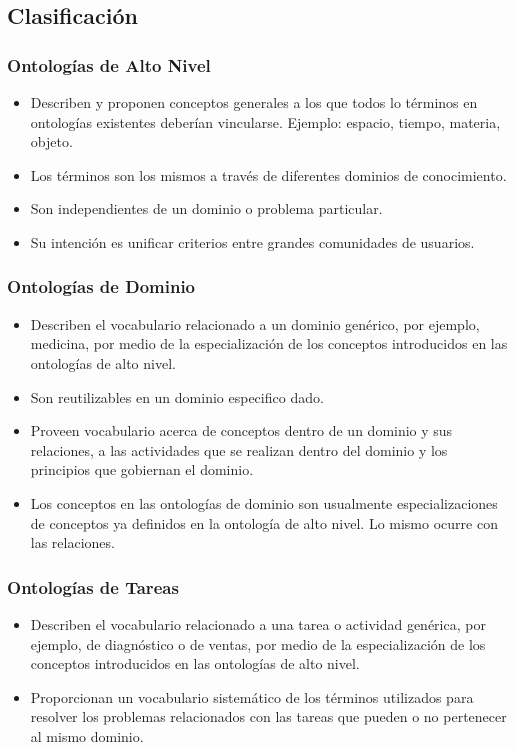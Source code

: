 \documentclass[a4paper,12pt,twoside,final,spanish]{article}
\begin{document}
\subsection{Clasificación}

\subsubsection{Ontologías de Alto Nivel}

\begin{itemize}
\item Describen y proponen conceptos generales a los que todos lo términos en ontologías existentes deberían vincularse. Ejemplo: espacio, tiempo, materia, objeto.
\item Los términos son los mismos a través de diferentes dominios de conocimiento.
\item Son independientes de un dominio o problema particular.
\item Su intención es unificar criterios entre grandes comunidades de usuarios. 
\end{itemize}

\subsubsection{Ontologías de Dominio}

\begin{itemize}
\item Describen el vocabulario relacionado a un dominio genérico, por ejemplo,  medicina, por medio de la especialización de los conceptos introducidos en las  ontologías de alto nivel.
\item Son reutilizables en un dominio especifico dado.
\item Proveen vocabulario acerca de conceptos dentro de un dominio y sus relaciones, a las actividades que se realizan dentro del dominio y los principios que gobiernan el dominio.
\item Los conceptos en las ontologías de dominio son usualmente especializaciones de conceptos ya definidos en la ontología de alto nivel. Lo mismo ocurre con las relaciones.
\end{itemize}

\subsubsection{Ontologías de Tareas}

\begin{itemize}
\item Describen el vocabulario relacionado a una tarea o actividad genérica, por ejemplo, de diagnóstico o de ventas, por medio de la especialización de los conceptos introducidos en las ontologías de alto nivel.
\item Proporcionan un vocabulario sistemático de los términos utilizados para resolver los problemas relacionados con las tareas que pueden o no pertenecer al mismo dominio.
\end{itemize}
\end{document}
